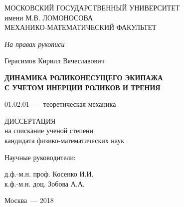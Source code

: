 \thispagestyle{empty}%
\begin{center}%
\MakeUppercase{Московский государственный университет}\\
имени \MakeUppercase{М.В. Ломоносова}\\
\MakeUppercase{механико-математический факультет}%
\end{center}%
%
\vspace{0pt plus4fill} %
\begin{flushright}%

\textit {На правах рукописи}
\end{flushright}%
%
\vspace{0pt plus6fill} %
\begin{center}%
{\large Герасимов Кирилл Вячеславович}
\end{center}%
%
\vspace{0pt plus1fill} %
\begin{center}%
\textbf{ДИНАМИКА РОЛИКОНЕСУЩЕГО ЭКИПАЖА \\ С УЧЕТОМ ИНЕРЦИИ РОЛИКОВ И ТРЕНИЯ}

 \vspace{0pt plus6fill} %
01.02.01~---~теоретическая механика

\vspace{0pt plus4fill} %
ДИССЕРТАЦИЯ \\ на соискание ученой степени \\ кандидата физико-математических наук

\end{center}%
\vspace{0pt plus4fill} %
\begin{flushright}%
Научные руководители:

д.ф.-м.н. проф. Косенко И.И.\\
к.ф.-м.н. доц. Зобова А.А.

\end{flushright}%
%
\vspace{0pt plus4fill} %
\begin{center}%
{Москва~--- 2018}
\end{center}%
\newpage
